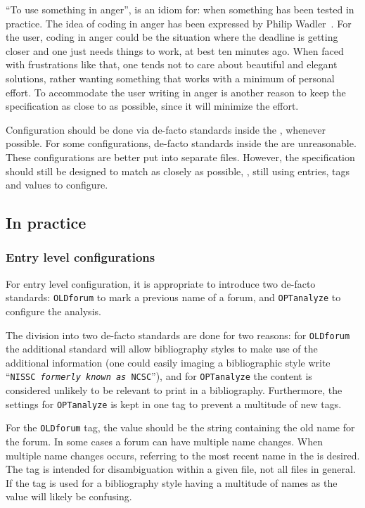 ``To use something in anger'', is an idiom for: when something has
been tested in practice.  The idea of coding in anger has been
expressed by Philip Wadler~\cite{wadler1997_functional}.  For the
{\bibtex} user, coding in anger could be the situation where the
deadline is getting closer and one just needs things to work, at best
ten minutes ago.  When faced with frustrations like that, one tends
not to care about beautiful and elegant solutions, rather wanting
something that works with a minimum of personal effort.  To
accommodate the user writing {\bibtex} in anger is another reason to
keep the specification as close to {\bibtex} as possible, since it
will minimize the effort.

Configuration should be done via de-facto standards inside the
, whenever possible.  For some configurations, de-facto
standards inside the  are unreasonable.  These
configurations are better put into separate files.  However, the
specification should still be designed to match {\bibtex} as closely
as possible, \ie, still using entries, tags and values to configure.


\subsection{In practice}
\label{sec:analyzing_in_practice}

\subsubsection{Entry level configurations}

For entry level configuration, it is appropriate to introduce two
de-facto standards: \texttt{OLDforum} to mark a previous name of a
forum, and \texttt{OPTanalyze} to configure the analysis.

The division into two de-facto standards are done for two reasons: for
\texttt{OLDforum} the additional standard will allow bibliography
styles to make use of the additional information (one could easily
imaging a bibliographic style write ``\texttt{NISSC \textit{formerly
    known as} NCSC}''), and for \texttt{OPTanalyze} the content is
considered unlikely to be relevant to print in a bibliography.
Furthermore, the settings for \texttt{OPTanalyze} is kept in one tag
to prevent a multitude of new tags.


For the \texttt{OLDforum} tag, the value should be the string
containing the old name for the forum.  In some cases a forum can have
multiple name changes.  When multiple name changes occurs, referring
to the most recent name in the  is desired.  The tag is
intended for disambiguation within a given file, not all files in
general.  If the tag is used for a bibliography style having a
multitude of names as the value will likely be confusing.


